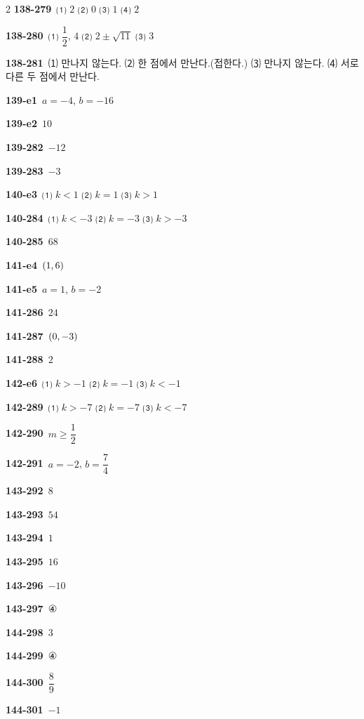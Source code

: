 \documentclass[10pt,a4paper]{article}
\begin{document}
\begin{multicols}{2}
\noindent\textbf{138-279}\ ⑴ $2$ \quad ⑵ $0$ \quad ⑶ $1$ \quad ⑷ $2$\par
\noindent\textbf{138-280}\ ⑴ $\dfrac{1}{2}$, $4$ \quad ⑵ $2\pm\sqrt{11}$ \quad ⑶ $3$\par
\noindent\textbf{138-281}\ ⑴ 만나지 않는다. \quad ⑵ 한 점에서 만난다.(접한다.) \quad ⑶ 만나지 않는다. \quad ⑷ 서로 다른 두 점에서 만난다.\par
\noindent\textbf{139-e1}\ $a=-4$, $b=-16$\par
\noindent\textbf{139-e2}\ $10$\par
\noindent\textbf{139-282}\ $-12$\par
\noindent\textbf{139-283}\ $-3$\par
\noindent\textbf{140-e3}\ ⑴ $k<1$ \quad ⑵ $k=1$ \quad ⑶ $k>1$\par
\noindent\textbf{140-284}\ ⑴ $k<-3$ \quad ⑵ $k=-3$ \quad ⑶ $k>-3$\par
\noindent\textbf{140-285}\ $68$\par
\noindent\textbf{141-e4}\ $(1{,}\mkern3mu\mathopen{}6)$\par
\noindent\textbf{141-e5}\ $a=1$, $b=-2$\par
\noindent\textbf{141-286}\ $24$\par
\noindent\textbf{141-287}\ $(0{,}\mkern3mu\mathopen{}-3)$\par
\noindent\textbf{141-288}\ $2$\par
\noindent\textbf{142-e6}\ ⑴ $k>-1$ \quad ⑵ $k=-1$ \quad ⑶ $k<-1$\par
\noindent\textbf{142-289}\ ⑴ $k>-7$ \quad ⑵ $k=-7$ \quad ⑶ $k<-7$\par
\noindent\textbf{142-290}\ $m\ge\dfrac{1}{2}$\par
\noindent\textbf{142-291}\ $a=-2$, $b=\dfrac{7}{4}$\par
\noindent\textbf{143-292}\ $8$\par
\noindent\textbf{143-293}\ $54$\par
\noindent\textbf{143-294}\ $1$\par
\noindent\textbf{143-295}\ $16$\par
\noindent\textbf{143-296}\ $-10$\par
\noindent\textbf{143-297}\ ④\par
\noindent\textbf{144-298}\ $3$\par
\noindent\textbf{144-299}\ ④\par
\noindent\textbf{144-300}\ $\dfrac{8}{9}$\par
\noindent\textbf{144-301}\ $-1$\par

\end{multicols}
\end{document}
